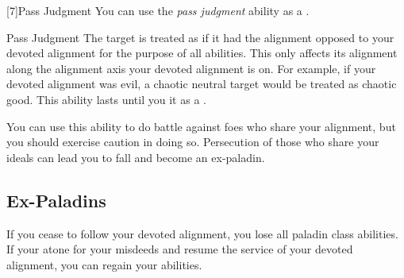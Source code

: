         [7]{Pass Judgment} You can use the \textit{pass judgment} ability as a .
        \begin{durationability}{Pass Judgment}
            \rankline
            The target is treated as if it had the alignment opposed to your devoted alignment for the purpose of all abilities.
            This only affects its alignment along the alignment axis your devoted alignment is on.
            For example, if your devoted alignment was evil, a chaotic neutral target would be treated as chaotic good.
            This ability lasts until you  it as a .

            You can use this ability to do battle against foes who share your alignment, but you should exercise caution in doing so.
            Persecution of those who share your ideals can lead you to fall and become an ex-paladin.
        \end{durationability}


    \subsection{Ex-Paladins}
        If you cease to follow your devoted alignment, you lose all  paladin class abilities.
        If your atone for your misdeeds and resume the service of your devoted alignment, you can regain your abilities.

